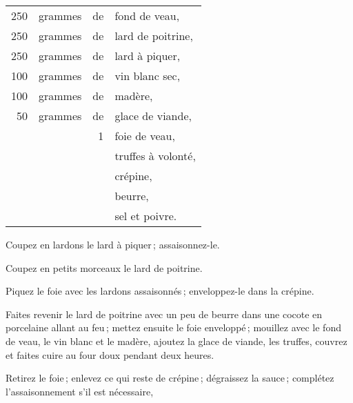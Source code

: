 \footnotesize
\begin{longtable}{rrrp{18em}}
    250 & grammes & de & fond de veau,                                                                    \\
    250 & grammes & de & lard de poitrine,                                                                \\
    250 & grammes & de & lard à piquer,                                                                   \\
    100 & grammes & de & vin blanc sec,                                                                   \\
    100 & grammes & de & madère,                                                                          \\
     50 & grammes & de &  glace de viande,                                                                \\
        &         &  1 & foie de veau,                                                                    \\
        &         &    & truffes à volonté,                                                               \\
        &         &    & crépine,                                                                         \\
        &         &    & beurre,                                                                          \\
        &         &    & sel et poivre.                                                                   \\
\end{longtable}
\normalsize

Coupez en lardons le lard à piquer ; assaisonnez-le.

Coupez en petits morceaux le lard de poitrine.

Piquez le foie avec les lardons assaisonnés ; enveloppez-le dans la crépine.

Faites revenir le lard de poitrine avec un peu de beurre dans une cocote en
porcelaine allant au feu ; mettez ensuite le foie enveloppé ; mouillez avec le
fond de veau, le vin blanc et le madère, ajoutez la glace de viande, les
truffes, couvrez et faites cuire au four doux pendant deux heures.

Retirez le foie ; enlevez ce qui reste de crépine ; dégraissez la sauce ;
complétez l'assaisonnement s'il est nécessaire,

